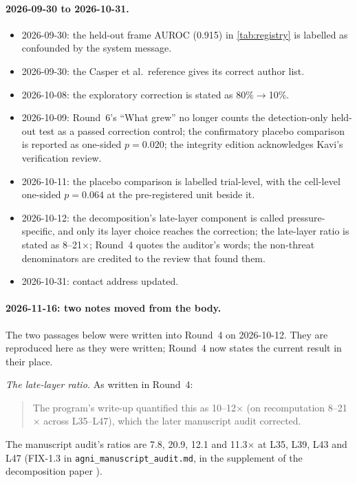 \documentclass[11pt,letterpaper]{article}
\begin{document}
\paragraph{2026-09-30 to 2026-10-31.}
\begin{itemize}[nosep]
  \item 2026-09-30: the held-out frame AUROC (0.915) in \cref{tab:registry} is labelled as confounded by
    the system message.
  \item 2026-09-30: the Casper et al.\ reference gives its correct author list.
  \item 2026-10-08: the exploratory correction is stated as 80\%$\to$10\%.
  \item 2026-10-09: Round~6's ``What grew'' no longer counts the detection-only held-out test as a
    passed correction control; the confirmatory placebo comparison is reported as one-sided $p=0.020$;
    the integrity edition acknowledges Kavi's verification review.
  \item 2026-10-11: the placebo comparison is labelled trial-level, with the cell-level one-sided
    $p=0.064$ at the pre-registered unit beside it.
  \item 2026-10-12: the decomposition's late-layer component is called pressure-specific, and only its
    layer choice reaches the correction; the late-layer ratio is stated as 8--21$\times$; Round~4
    quotes the auditor's words; the non-threat denominators are credited to the review that found them.
  \item 2026-10-31: contact address updated.
\end{itemize}

\paragraph{2026-11-16: two notes moved from the body.} The two passages below were written into
Round~4 on 2026-10-12. They are reproduced here as they were written; Round~4 now states the current
result in their place.

\emph{The late-layer ratio.} As written in Round~4:
\begin{quote}
The program's write-up quantified this as 10--12$\times$ (on recomputation 8--21$\times$ across
L35--L47), which the later manuscript audit corrected.
\end{quote}
The manuscript audit's ratios are 7.8, 20.9, 12.1 and 11.3$\times$ at L35, L39, L43 and L47 (FIX-1.3 in
\texttt{agni\_manuscript\_audit.md}, in the supplement of the decomposition paper
\cite{cc2026composites}).
\end{document}
